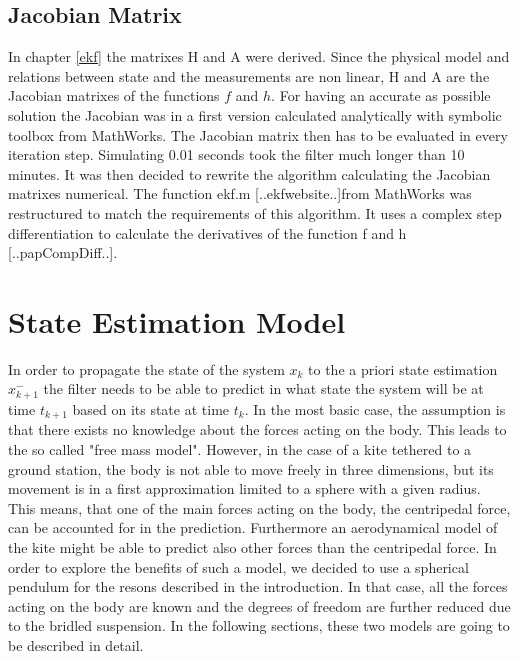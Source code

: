 \subsection*{Jacobian Matrix}
In chapter \ref{ekf} the matrixes H and A were derived. Since the physical model and relations between state and the measurements are non linear, H and A are the Jacobian matrixes of the functions $f$ and $h$. For having an accurate as possible solution the Jacobian was in a first version calculated analytically with symbolic toolbox from MathWorks. The Jacobian matrix then has to be evaluated in every iteration step. Simulating 0.01 seconds took the filter much longer than 10 minutes. It was then decided to rewrite the algorithm calculating the Jacobian matrixes numerical. The function ekf.m [..ekfwebsite..]from MathWorks was restructured to match the requirements of this algorithm. It uses a complex step differentiation to calculate the derivatives of the function f and h [..papCompDiff..]. 


\section{State Estimation Model}\label{state_estimation}
In order to propagate the state of the system $x_{k}$ to the a priori state estimation $x^{-}_{k+1}$ the filter needs to be able to predict in what state the system will be at time $t_{k+1}$ based on its state at time $t_{k}$. In the most basic case, the assumption is that there exists no knowledge about the forces acting on the body. This leads to the so called "free mass model". However, in the case of a kite tethered to a ground station, the body is not able to move freely in three dimensions, but its movement is in a first approximation limited to a sphere with a given radius. This means, that one of the main forces acting on the body, the centripedal force, can be accounted for in the prediction. Furthermore an aerodynamical model of the kite might be able to predict also other forces than the centripedal force. In order to explore the benefits of such a model, we decided to use a spherical pendulum for the resons described in the introduction. In that case, all the forces acting on the body are known and the degrees of freedom are further reduced due to the bridled suspension. In the following sections, these two models are going to be described in detail. 

